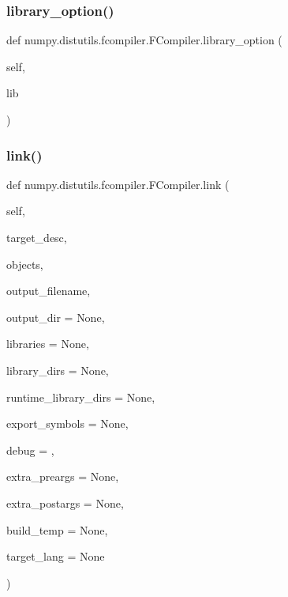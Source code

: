 \mbox{\label{classnumpy_1_1distutils_1_1fcompiler_1_1FCompiler_a112ff3629e683da8a963d684a5e99c14}} 
\subsubsection{\texorpdfstring{library\+\_\+option()}{library\_option()}}
{\footnotesize\ttfamily def numpy.\+distutils.\+fcompiler.\+F\+Compiler.\+library\+\_\+option (\begin{DoxyParamCaption}\item[{}]{self,  }\item[{}]{lib }\end{DoxyParamCaption})}

\mbox{\label{classnumpy_1_1distutils_1_1fcompiler_1_1FCompiler_ad8ac588e88b603ca48db79565dc9f8b6}} 
\subsubsection{\texorpdfstring{link()}{link()}}
{\footnotesize\ttfamily def numpy.\+distutils.\+fcompiler.\+F\+Compiler.\+link (\begin{DoxyParamCaption}\item[{}]{self,  }\item[{}]{target\+\_\+desc,  }\item[{}]{objects,  }\item[{}]{output\+\_\+filename,  }\item[{}]{output\+\_\+dir = {\ttfamily None},  }\item[{}]{libraries = {\ttfamily None},  }\item[{}]{library\+\_\+dirs = {\ttfamily None},  }\item[{}]{runtime\+\_\+library\+\_\+dirs = {\ttfamily None},  }\item[{}]{export\+\_\+symbols = {\ttfamily None},  }\item[{}]{debug = {},  }\item[{}]{extra\+\_\+preargs = {\ttfamily None},  }\item[{}]{extra\+\_\+postargs = {\ttfamily None},  }\item[{}]{build\+\_\+temp = {\ttfamily None},  }\item[{}]{target\+\_\+lang = {\ttfamily None} }\end{DoxyParamCaption})}

